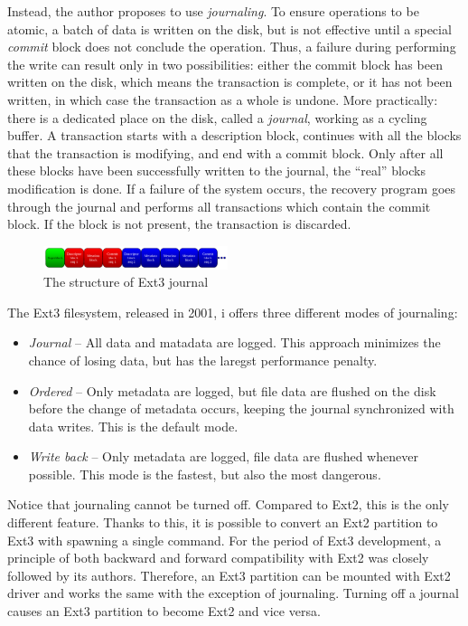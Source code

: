 \documentclass{acm_proc_article-sp}
\begin{document}
Instead, the author proposes to use {\it journaling}. To ensure operations to be atomic, a batch of data is written on the disk, but is not effective until a special {\it commit} block does not conclude the operation. Thus, a failure during performing the write can result only in two possibilities: either the commit block has been written on the disk, which means the transaction is complete, or it has not been written, in which case the transaction as a whole is undone. More practically: there is a dedicated place on the disk, called a {\it journal}, working as a cycling buffer. A transaction starts with a description block, continues with all the blocks that the transaction is modifying, and end with a commit block. Only after all these blocks have been successfully written to the journal, the ``real'' blocks modification is done. If a failure of the system occurs, the recovery program goes through the journal and performs all transactions which contain the commit block. If the block is not present, the transaction is discarded.

\begin{figure}
\centering
\includegraphics[width=0.48\textwidth]{images/journal.pdf}
	\caption{The structure of Ext3 journal \cite{takingadvantage}}
\end{figure}

The Ext3 filesystem, released in 2001, i offers three different modes of journaling: \cite{takingadvantage}

\begin{itemize}
	\item {\it Journal} -- All data and matadata are logged. This approach minimizes the chance of losing data, but has the laregst performance penalty.
	\item {\it Ordered} -- Only metadata are logged, but file data are flushed on the disk before the change of metadata occurs, keeping the journal synchronized with data writes. This is the default mode.
	\item {\it Write back} -- Only metadata are logged, file data are flushed whenever possible. This mode is the fastest, but also the most dangerous.
\end{itemize}

Notice that journaling cannot be turned off. Compared to Ext2, this is the only different feature. Thanks to this, it is possible to convert an Ext2 partition to Ext3 with spawning a single command.
For the period of Ext3 development, a principle of both backward and forward compatibility with Ext2 was closely followed by its authors. Therefore, an Ext3 partition can be mounted with Ext2 driver and works the same with the exception of journaling. Turning off a journal causes an Ext3 partition to become Ext2 and vice versa.
\end{document}
